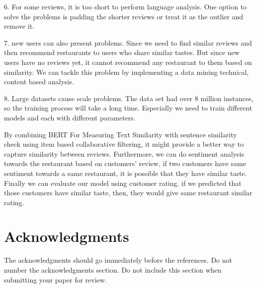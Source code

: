 \documentclass[11pt]{article}
\begin{document}
6. For some reviews, it is too short to perform language analysis. One option to solve the problems is padding the shorter reviews or treat it as the outlier and remove it. 

7. new users can also present problems. Since we need to find similar reviews and then recommend restaurants to users who share similar tastes. But since new users have no reviews yet, it cannot recommend any restaurant to them based on similarity. We can tackle this problem by implementing a data mining technical, content based analysis. 

8. Large datasets cause scale problems. The data set had over 8 million instances, so the training process will take a long time. Especially we need to train different models and each with different parameters. 

By combining BERT For Measuring Text Similarity with sentence similarity check using item based collaborative filtering, it might provide a better way to capture similarity between reviews. Furthermore, we can do sentiment analysis towards the restaurant based on customers' review, if two customers have same sentiment towards a same restaurant, it is possible that they have similar taste. Finally we can evaluate our model using customer rating. if we predicted that those customers have similar taste, then, they would give same restaurant similar rating. 



\section*{Acknowledgments}

The acknowledgments should go immediately before the references.  Do
not number the acknowledgments section. Do not include this section
when submitting your paper for review.



\end{document}
